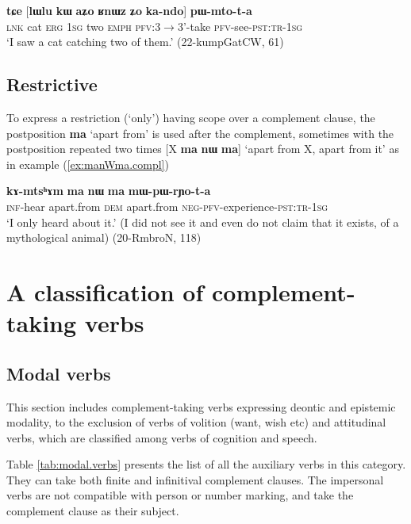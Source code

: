 \documentclass[oneside,a4paper,11pt]{article}
\newcommand{\ipa}[1]{\textbf{\phon#1}} %
\begin{document}
 \begin{exe}
\ex \label{ex:lWlu.kW.aZo}
\gll \ipa{tɕe} 	[\ipa{lɯlu} 	\ipa{kɯ} 	\ipa{aʑo} 	\ipa{ʁnɯz} 	\ipa{ʑo} 	\ipa{ka-ndo}] 	\ipa{pɯ-mto-t-a} \\
\textsc{lnk} cat \textsc{erg} \textsc{1sg} two \textsc{emph} \textsc{pfv}:3$\rightarrow$3'-take \textsc{pfv}-see-\textsc{pst:tr-1sg} \\
\glt `I saw a cat catching two of them.' (22-kumpGatCW, 61)
\end{exe}
 
\subsection{Restrictive} 
To express a restriction (`only') having scope over a complement clause, the postposition \ipa{ma} `apart from' is used after the complement, sometimes with the postposition repeated two times [X \ipa{ma} \ipa{nɯ} \ipa{ma}] `apart from X, apart from it' as in example (\ref{ex:manWma.compl})

\begin{exe}
\ex \label{ex:manWma.compl}
\gll \ipa{kɤ-mtsʰɤm} 	\ipa{ma} 	\ipa{nɯ} 	\ipa{ma} 	\ipa{mɯ-pɯ-rɲo-t-a} \\
\textsc{inf}-hear apart.from \textsc{dem} apart.from \textsc{neg-pfv}-experience-\textsc{pst:tr-1sg} \\
\glt `I only heard about it.' (I did not see it and even do not claim that it exists, of a mythological animal) (20-RmbroN, 118)
\end{exe}
 
  \section{A classification of complement-taking verbs} 
  \subsection{Modal verbs}
This section includes complement-taking verbs expressing deontic and epistemic modality, to the exclusion of verbs of volition (want, wish etc) and attitudinal verbs, which are classified among verbs of cognition and speech.

Table \ref{tab:modal.verbs} presents the list of all the auxiliary verbs in this category. They can take both finite and infinitival complement clauses. The impersonal verbs are not compatible with person or number marking, and take the complement clause as their subject. 
\end{document}
